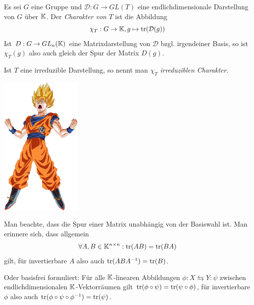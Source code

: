 \begin{minipage}{10cm}
\begin{definition}[Charaktere]
Es sei $G$ eine Gruppe und $\mathcal{D}: G\to GL(T)$ eine endlichdimensionale Darstellung von $G$ über $\mathbb{K}$. Der \emph{Charakter von $T$} ist die Abbildung
\[\chi_T: G\to \mathbb{K}, g\mapsto \operatorname{tr}(\mathcal{D}(g))\]
Ist $D: G\to GL_n(\mathbb{K})$ eine Matrixdarstellung von $\mathcal{D}$ bzgl. irgendeiner Basis, so ist $\chi_T(g)$ also auch gleich der Spur der Matrix $D(g)$.

Ist $T$ eine irreduzible Darstellung, so nennt man $\chi_T$ \emph{irreduziblen Charakter}.
\end{definition}
\end{minipage}\hfill
\begin{minipage}{4cm}
\setlength{\baselineskip}{7pt}
\includegraphics[width=4cm]{pictures/levelup2.png}
\end{minipage}

\begin{remark}
Man beachte, dass die Spur einer Matrix unabhängig von der Basiswahl ist. Man erinnere sich, dass allgemein
\[\forall A,B\in \mathbb{K}^{n\times n}: \operatorname{tr}(AB) = \operatorname{tr}(BA)\]
gilt, für invertierbare $A$ also auch $\operatorname{tr}(ABA^{-1}) = \operatorname{tr}(B)$.

Oder basisfrei formuliert: Für alle $\mathbb{K}$-linearen Abbildungen $\phi: X \leftrightarrows Y : \psi$ zwischen endlichdimensionalen $\mathbb{K}$-Vektorräumen gilt $\operatorname{tr}(\phi\circ\psi) = \operatorname{tr}(\psi\circ\phi)$, für invertierbare $\phi$ also auch $\operatorname{tr}(\phi\circ\psi\circ\phi^{-1}) = \operatorname{tr}(\psi)$.
\end{remark}

